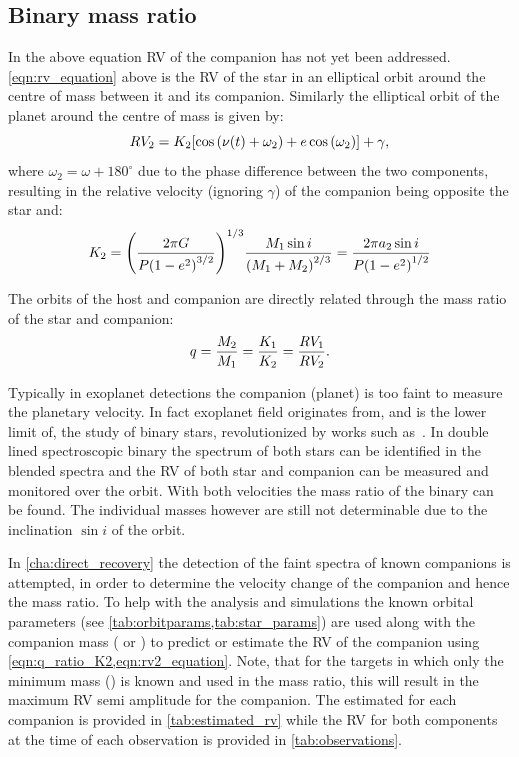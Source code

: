 \subsection{Binary mass ratio}
\label{subsec:binary_mass_ratio}
In the above equation {RV} of the companion has not yet been addressed.
\cref{eqn:rv_equation} above is the {RV} of the star in an elliptical orbit around the centre of mass between it and its companion.
Similarly the elliptical orbit of the planet around the centre of mass is given by:
\begin{equation}
    {RV_{2}} = {K}_{2}{} [\cos{(\nu(t) + \omega_{2})} + e\cos{(\omega_{2})}] + \gamma, \label{eqn:rv2_equation}
\end{equation}
where \(\omega_{2} = \omega + 180^\circ\) due to the phase difference between the two components, resulting in the relative velocity (ignoring \(\gamma\)) of the companion being opposite the star and:
\begin{equation}
    {K}_{2}  = {\left(  \frac{2 \pi G}{P{(1 - {e}^{2})}^{3/2}} \right)}^{1/3} \frac{{M}_{1} \sin{i}}{{({M}_{1} + {M}_{2})}^{2/3}} = \frac{2 \pi a_2 \sin{i}}{P{(1 - {e}^{2})}^{1/2}} \label{eqn:ktwo}
\end{equation}

The orbits of the host and companion are directly related through the mass ratio of the star and companion:
\begin{equation}
q = \frac{\mtwo}{\mone} = \frac{\kone}{\ktwo} = \frac{RV_{1}}{RV_{2}}  \label{eqn:q_ratio_K2}. %
\end{equation}

Typically in exoplanet detections the companion (planet) is too faint to measure the planetary velocity.
In fact exoplanet field originates from, and is the lower limit of, the study of binary stars, revolutionized by works such as~\citet{duquennoy_multiplicity_1991}.
In double lined spectroscopic binary the spectrum of both stars can be identified in the blended spectra and the {RV} of both star and companion can be measured and monitored over the orbit.
With both velocities the mass ratio of the binary can be found.
The individual masses however are still not determinable due to the inclination $\sin{i}$ of the orbit.

In \cref{cha:direct_recovery} the detection of the faint spectra of known companions is attempted, in order to determine the velocity change of the companion and hence the mass ratio.
To help with the analysis and simulations the known orbital parameters (see \cref{tab:orbitparams,tab:star_params}) are used along with the companion mass (\Mtwo{} or \Mtwosini{}) to predict or estimate the {RV} of the companion using \cref{eqn:q_ratio_K2,eqn:rv2_equation}.
Note, that for the targets in which only the minimum mass (\Mtwosini{}) is known and used in the mass ratio, this will result in the maximum {RV} semi amplitude for the companion.
The estimated \Ktwo{} for each companion is provided in \cref{tab:estimated_rv} while the {RV} for both components at the time of each observation is provided in \cref{tab:observations}.
